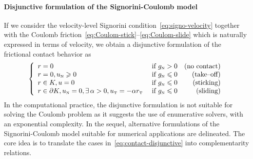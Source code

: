 {\paragraph{Disjunctive formulation of the Signorini-Coulomb model}

If we consider the velocity-level Signorini condition~\eqref{eq:signo-velocity} together with the Coulomb friction~\eqref{eq:Coulom-stick}--\eqref{eq:Coulom-slide} which is naturally expressed in terms of velocity, we obtain a disjunctive formulation of the frictional contact behavior as
\begin{equation}
  \label{eq:contact-disjunctive}
  \left\{\begin{array}{llr}
      r = 0  &\text{ if } g_{\n} > 0  & \text{(no contact)}\\
      r = 0,  u_\n \geq 0   &\text{ if } g_{\n} \leq 0 & \text{(take--off)} \\
      r \in K, u =0 &\text{ if } g_{\n} \leq 0 & \text{(sticking)}  \\
      r \in \partial K,u _\n=0,  \exists\,\alpha > 0, u_\t = -\alpha r_\t &\text{ if } g_{\n} \leq 0 & \text{(sliding)}  \\
\end{array}\right.
\end{equation}
In the computational practice, the disjunctive formulation is not suitable for  solving the Coulomb problem as it suggests the use of enumerative solvers, with an exponential complexity.
In the sequel, alternative formulations of the Signorini-Coulomb model suitable for numerical applications are delineated.
The core idea is to translate the cases in~\eqref{eq:contact-disjunctive} into complementarity relations.

}
